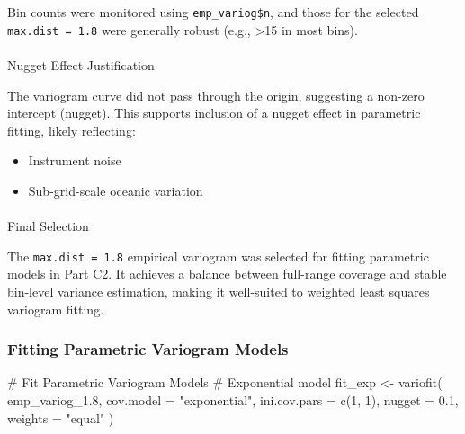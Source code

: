 \documentclass[
  11pt,
]{article}
\makeatletter
\let\oldparagraph\paragraph
\renewcommand{\paragraph}{
    \@ifstar
      \xxxParagraphStar
      \xxxParagraphNoStar
  }
\newcommand{\xxxParagraphStar}[1]{\oldparagraph*{#1}\mbox{}}
\newcommand{\xxxParagraphNoStar}[1]{\oldparagraph{#1}\mbox{}}
\newenvironment{Shaded}{\begin{snugshade}}{\end{snugshade}}
\newcommand{\AttributeTok}[1]{\textcolor[rgb]{0.40,0.45,0.13}{#1}}
\newcommand{\CommentTok}[1]{\textcolor[rgb]{0.37,0.37,0.37}{#1}}
\newcommand{\DecValTok}[1]{\textcolor[rgb]{0.68,0.00,0.00}{#1}}
\newcommand{\FloatTok}[1]{\textcolor[rgb]{0.68,0.00,0.00}{#1}}
\newcommand{\FunctionTok}[1]{\textcolor[rgb]{0.28,0.35,0.67}{#1}}
\newcommand{\NormalTok}[1]{\textcolor[rgb]{0.00,0.23,0.31}{#1}}
\newcommand{\OtherTok}[1]{\textcolor[rgb]{0.00,0.23,0.31}{#1}}
\newcommand{\StringTok}[1]{\textcolor[rgb]{0.13,0.47,0.30}{#1}}
\makeatother
\begin{document}
Bin counts were monitored using \texttt{emp\_variog\$n}, and those for
the selected \texttt{max.dist\ =\ 1.8} were generally robust (e.g.,
\textgreater15 in most bins).

\paragraph{Nugget Effect
Justification}\label{nugget-effect-justification}

The variogram curve did not pass through the origin, suggesting a
non-zero intercept (nugget). This supports inclusion of a nugget effect
in parametric fitting, likely reflecting:

\begin{itemize}
\item
  Instrument noise
\item
  Sub-grid-scale oceanic variation
\end{itemize}

\paragraph{Final Selection}\label{final-selection}

The \texttt{max.dist\ =\ 1.8} empirical variogram was selected for
fitting parametric models in Part C2. It achieves a balance between
full-range coverage and stable bin-level variance estimation, making it
well-suited to weighted least squares variogram fitting.

\subsubsection{Fitting Parametric Variogram
Models}\label{fitting-parametric-variogram-models}

\begin{Shaded}
\begin{Highlighting}[]
\CommentTok{\#  Fit Parametric Variogram Models}
\CommentTok{\# Exponential model}
\NormalTok{fit\_exp }\OtherTok{\textless{}{-}} \FunctionTok{variofit}\NormalTok{(}
\NormalTok{  emp\_variog\_1}\FloatTok{.8}\NormalTok{,}
  \AttributeTok{cov.model =} \StringTok{"exponential"}\NormalTok{,}
  \AttributeTok{ini.cov.pars =} \FunctionTok{c}\NormalTok{(}\DecValTok{1}\NormalTok{, }\DecValTok{1}\NormalTok{),}
  \AttributeTok{nugget =} \FloatTok{0.1}\NormalTok{,}
  \AttributeTok{weights =} \StringTok{"equal"}
\NormalTok{)}
\end{Highlighting}
\end{Shaded}
\end{document}
